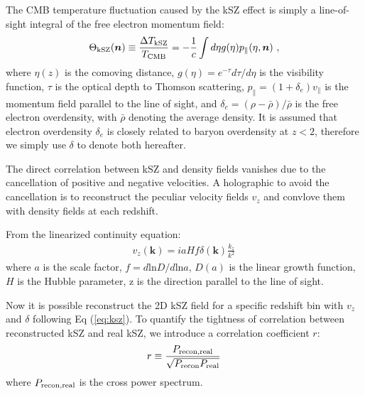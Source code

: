 \label{sec:kszRecon}
The CMB temperature fluctuation caused by the kSZ effect is simply a line-of-sight integral of the free electron momentum field:
\begin{eqnarray}
\label{eq:ksz}
\Theta_\mathrm{kSZ}(\bm{n})\equiv\frac{\Delta T_\mathrm{kSZ}}{T_{\mathrm{CMB}}}
=-\frac{1}{c}\int d\eta  g(\eta)  p_\parallel(\eta,\bm{n})\ ,
\end{eqnarray}
where $\eta(z)$ is the comoving distance, $g(\eta)=e^{-\tau} d\tau/d\eta$ is the visibility function, $\tau$ is the optical depth to Thomson scattering, 
$p_\parallel=(1+\delta_e)v_\parallel$ is the momentum field parallel to the line of sight, and $\delta_e=(\rho-\bar{\rho})/\bar{\rho}$ is the free electron overdensity, with $\bar\rho$ denoting the average density. It is assumed that electron overdensity $\delta_e$ is closely related to baryon overdensity at $z<2$, therefore we simply use $\delta$ to denote both hereafter.

The direct correlation between kSZ and density fields vanishes due to the cancellation of positive and negative velocities. 
A holographic to avoid the cancellation is to reconstruct the peculiar velocity fields $v_z$ and convlove them with density fields at each redshift. 

From the linearized continuity equation:
\begin{eqnarray}
	\label{eq:v}
v_z(\bm{k})=i a H f\delta(\bm{k})\frac{k_z}{k^2}\,
\end{eqnarray}
where $a$ is the scale factor, $f=d\mathrm{ln}D/d\mathrm{ln}a$, $D(a)$ is the linear growth function, $H$ is the Hubble parameter, z is the direction 
parallel to the line of sight.

Now it is possible reconstruct the 2D kSZ field 
for a specific redshift bin 
with $v_z$ and $\delta$ following Eq (\ref{eq:ksz}). 
To quantify the tightness of correlation between reconstructed kSZ and real kSZ, 
we introduce a correlation coefficient $r$:
\begin{eqnarray}
\label{eq:r}
	r\equiv \frac{P_\mathrm{recon,real}}{\sqrt{P_\mathrm{recon}P_\mathrm{real}}}\,
\end{eqnarray}
where $P_\mathrm{recon,real}$ is the cross power spectrum.

